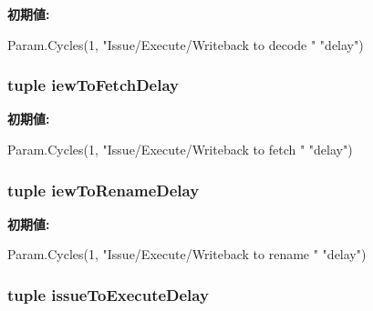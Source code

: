 \label{classO3CPU_1_1DerivO3CPU_a9876f37ad91dd63a32345b53aafbddc6}
{\bfseries 初期値:}
\begin{DoxyCode}
Param.Cycles(1, "Issue/Execute/Writeback to decode "
                                    "delay")
\end{DoxyCode}
\hypertarget{classO3CPU_1_1DerivO3CPU_a63165fb771c6aa1ecca842abe393a831}{
\subsubsection[{iewToFetchDelay}]{\setlength{\rightskip}{0pt plus 5cm}tuple {\bf iewToFetchDelay}}}
\label{classO3CPU_1_1DerivO3CPU_a63165fb771c6aa1ecca842abe393a831}
{\bfseries 初期値:}
\begin{DoxyCode}
Param.Cycles(1, "Issue/Execute/Writeback to fetch "
                                   "delay")
\end{DoxyCode}
\hypertarget{classO3CPU_1_1DerivO3CPU_a54dd22869ae708c0b6bffab65d4d03c5}{
\subsubsection[{iewToRenameDelay}]{\setlength{\rightskip}{0pt plus 5cm}tuple {\bf iewToRenameDelay}}}
\label{classO3CPU_1_1DerivO3CPU_a54dd22869ae708c0b6bffab65d4d03c5}
{\bfseries 初期値:}
\begin{DoxyCode}
Param.Cycles(1, "Issue/Execute/Writeback to rename "
                                    "delay")
\end{DoxyCode}
\hypertarget{classO3CPU_1_1DerivO3CPU_ab445ea6366a58d7753b058bd794548a8}{
\subsubsection[{issueToExecuteDelay}]{\setlength{\rightskip}{0pt plus 5cm}tuple {\bf issueToExecuteDelay}}}
